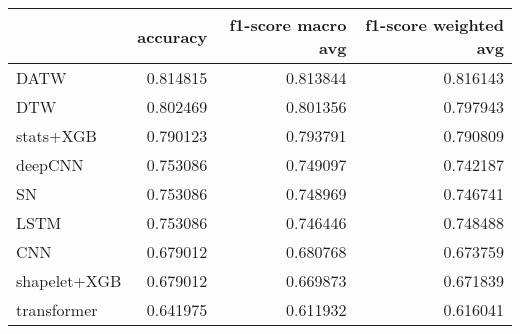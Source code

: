 \begin{tabular}{lrrr}
\toprule
 & accuracy & f1-score macro avg & f1-score weighted avg \\
\midrule
DATW & {\cellcolor[HTML]{08306B}} \color[HTML]{F1F1F1} 0.814815 & {\cellcolor[HTML]{08306B}} \color[HTML]{F1F1F1} 0.813844 & {\cellcolor[HTML]{08306B}} \color[HTML]{F1F1F1} 0.816143 \\
DTW & {\cellcolor[HTML]{084387}} \color[HTML]{F1F1F1} 0.802469 & {\cellcolor[HTML]{084082}} \color[HTML]{F1F1F1} 0.801356 & {\cellcolor[HTML]{08488E}} \color[HTML]{F1F1F1} 0.797943 \\
stats+XGB & {\cellcolor[HTML]{0B559F}} \color[HTML]{F1F1F1} 0.790123 & {\cellcolor[HTML]{084A91}} \color[HTML]{F1F1F1} 0.793791 & {\cellcolor[HTML]{08519C}} \color[HTML]{F1F1F1} 0.790809 \\
deepCNN & {\cellcolor[HTML]{3D8DC4}} \color[HTML]{F1F1F1} 0.753086 & {\cellcolor[HTML]{3484BF}} \color[HTML]{F1F1F1} 0.749097 & {\cellcolor[HTML]{4090C5}} \color[HTML]{F1F1F1} 0.742187 \\
SN & {\cellcolor[HTML]{3D8DC4}} \color[HTML]{F1F1F1} 0.753086 & {\cellcolor[HTML]{3484BF}} \color[HTML]{F1F1F1} 0.748969 & {\cellcolor[HTML]{3A8AC2}} \color[HTML]{F1F1F1} 0.746741 \\
LSTM & {\cellcolor[HTML]{3D8DC4}} \color[HTML]{F1F1F1} 0.753086 & {\cellcolor[HTML]{3787C0}} \color[HTML]{F1F1F1} 0.746446 & {\cellcolor[HTML]{3888C1}} \color[HTML]{F1F1F1} 0.748488 \\
CNN & {\cellcolor[HTML]{CDE0F1}} \color[HTML]{000000} 0.679012 & {\cellcolor[HTML]{A9CFE5}} \color[HTML]{000000} 0.680768 & {\cellcolor[HTML]{BAD6EB}} \color[HTML]{000000} 0.673759 \\
shapelet+XGB & {\cellcolor[HTML]{CDE0F1}} \color[HTML]{000000} 0.679012 & {\cellcolor[HTML]{BAD6EB}} \color[HTML]{000000} 0.669873 & {\cellcolor[HTML]{BDD7EC}} \color[HTML]{000000} 0.671839 \\
transformer & {\cellcolor[HTML]{F7FBFF}} \color[HTML]{000000} 0.641975 & {\cellcolor[HTML]{F7FBFF}} \color[HTML]{000000} 0.611932 & {\cellcolor[HTML]{F7FBFF}} \color[HTML]{000000} 0.616041 \\
\bottomrule
\end{tabular}
